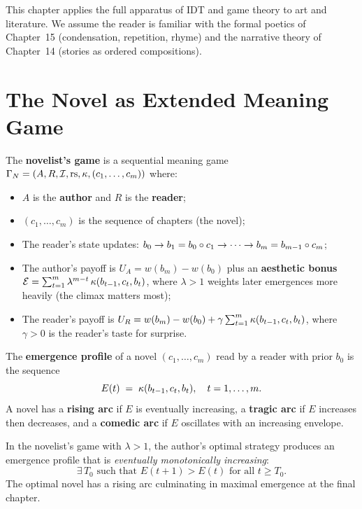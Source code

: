 This chapter applies the full apparatus of IDT and game theory to
art and literature.  We assume the reader is familiar with the
formal poetics of Chapter~15 (condensation, repetition, rhyme)
and the narrative theory of Chapter~14 (stories as ordered
compositions).

\section{The Novel as Extended Meaning Game}
\label{sec:novel}

\begin{game}
\label{game:novelist}
The \textbf{novelist's game} is a sequential meaning game
$\Gamma_N = (A, R, \mathcal{I}, \mathrm{rs}, \kappa, (c_1,\ldots,c_m))$ where:
\begin{itemize}
  \item $A$ is the \textbf{author} and $R$ is the \textbf{reader};
  \item $(c_1, \ldots, c_m)$ is the sequence of chapters (the novel);
  \item The reader's state updates: $b_0 \to b_1 = b_0 \circ c_1
    \to \cdots \to b_m = b_{m-1} \circ c_m$;
  \item The author's payoff is $U_A = w(b_m) - w(b_0)$ plus an
    \textbf{aesthetic bonus}
    $\mathcal{E} = \sum_{t=1}^{m} \lambda^{m-t}\,\kappa(b_{t-1},
    c_t, b_t)$, where $\lambda > 1$ weights later emergences more
    heavily (the climax matters most);
  \item The reader's payoff is $U_R = w(b_m) - w(b_0) + \gamma
    \sum_{t=1}^m \kappa(b_{t-1}, c_t, b_t)$, where $\gamma > 0$
    is the reader's taste for surprise.
\end{itemize}
\end{game}

\begin{definition}
\label{def:narrative-arc}
The \textbf{emergence profile} of a novel $(c_1,\ldots,c_m)$ read
by a reader with prior $b_0$ is the sequence
\[
  E(t) \;=\; \kappa(b_{t-1}, c_t, b_t), \quad t = 1,\ldots,m.
\]
A novel has a \textbf{rising arc} if $E$ is eventually increasing,
a \textbf{tragic arc} if $E$ increases then decreases, and a
\textbf{comedic arc} if $E$ oscillates with an increasing envelope.
\end{definition}

\begin{theorem}
\label{thm:optimal-narrative}
In the novelist's game with $\lambda > 1$, the author's optimal
strategy produces an emergence profile that is \emph{eventually
monotonically increasing}:
\[
  \exists\, T_0 \text{ such that }
  E(t+1) > E(t) \text{ for all } t \ge T_0.
\]
The optimal novel has a rising arc culminating in maximal
emergence at the final chapter.
\end{theorem}

